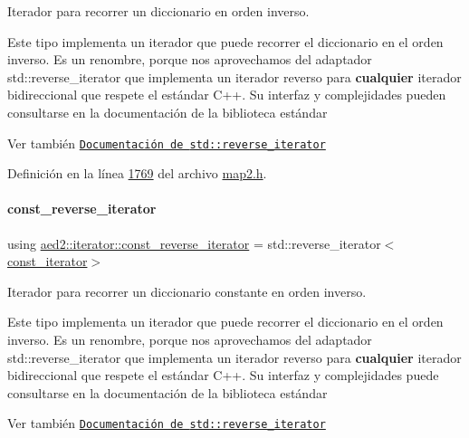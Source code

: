 Iterador para recorrer un diccionario en orden inverso. 

Este tipo implementa un iterador que puede recorrer el diccionario en el orden inverso. Es un renombre, porque nos aprovechamos del adaptador {\ttfamily std\+::reverse\+\_\+iterator} que implementa un iterador reverso para {\bfseries cualquier} iterador bidireccional que respete el estándar C++. Su interfaz y complejidades pueden consultarse en la documentación de la biblioteca estándar

\begin{DoxySeeAlso}{Ver también}
\href{http://en.cppreference.com/w/cpp/iterator/reverse_iterator}{\tt Documentación de {\ttfamily std\+::reverse\+\_\+iterator}} 
\end{DoxySeeAlso}


Definición en la línea \hyperlink{map2_8h_source_l01769}{1769} del archivo \hyperlink{map2_8h_source}{map2.\+h}.

\mbox{\label{classaed2_1_1iterator_a657402896e5b5966660032f5686cc4c4_a657402896e5b5966660032f5686cc4c4}} 
\paragraph{\texorpdfstring{const\+\_\+reverse\+\_\+iterator}{const\_reverse\_iterator}}
{\footnotesize\ttfamily using \hyperlink{classaed2_1_1iterator_a657402896e5b5966660032f5686cc4c4_a657402896e5b5966660032f5686cc4c4}{aed2\+::iterator\+::const\+\_\+reverse\+\_\+iterator} =  std\+::reverse\+\_\+iterator$<$\hyperlink{classaed2_1_1iterator_1_1const__iterator}{const\+\_\+iterator}$>$}



Iterador para recorrer un diccionario constante en orden inverso. 

Este tipo implementa un iterador que puede recorrer el diccionario en el orden inverso. Es un renombre, porque nos aprovechamos del adaptador {\ttfamily std\+::reverse\+\_\+iterator} que implementa un iterador reverso para {\bfseries cualquier} iterador bidireccional que respete el estándar C++. Su interfaz y complejidades puede consultarse en la documentación de la biblioteca estándar

\begin{DoxySeeAlso}{Ver también}
\href{http://en.cppreference.com/w/cpp/iterator/reverse_iterator}{\tt Documentación de {\ttfamily std\+::reverse\+\_\+iterator}} 
\end{DoxySeeAlso}



